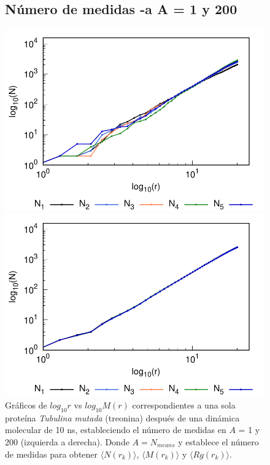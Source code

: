 		\begin{figure}[H]
		\subsection*{ Número de medidas -a A = 1 y 200}	
		\hspace{-0.3cm} 
		\begin{minipage}{0.49\textwidth}
			\centering
			\includegraphics[width=\linewidth,page=1]{graphs/PDBs/Tubb4/TubMutA=1.pdf}
		\end{minipage}
		\hspace{0.2cm}
		\begin{minipage}{0.49\textwidth}
			\centering
			\includegraphics[width=\linewidth,page=1]{graphs/PDBs/Tubb4/TubMutA=200.pdf}
		\end{minipage}
		
		\caption{
			Gr\'{a}ficos de $log_{10}r$ vs $log_{10}M(r)$ correspondientes a una sola proteína \textit{Tubulina mutada} (treonina) despu\'{e}s de una din\'{a}mica molecular de 10 ns, estableciendo el número de medidas en  $A$ = 1 y 200 (izquierda a derecha). Donde $A = N_{means}$ y establece el número de medidas para obtener $\langle N(r_k) \rangle$, $\langle M(r_k) \rangle$ y $\langle Rg(r_k) \rangle$.}
		\label{fig:Tubs}
		\end{figure}
		
